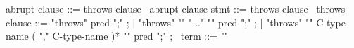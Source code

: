 \begin{syntax}
  abrupt-clause ::= throws-clause
  \
  abrupt-clause-stmt ::= throws-clause
  \
  throws-clause ::= "throws" pred ";" ;
                  | "throws" "{" "..." "}" pred ";" ;
                  | "throws" "{" C-type-name ( "," C-type-name )* "}" pred ";" ;
  \
  term ::= "\exception"
\end{syntax}
